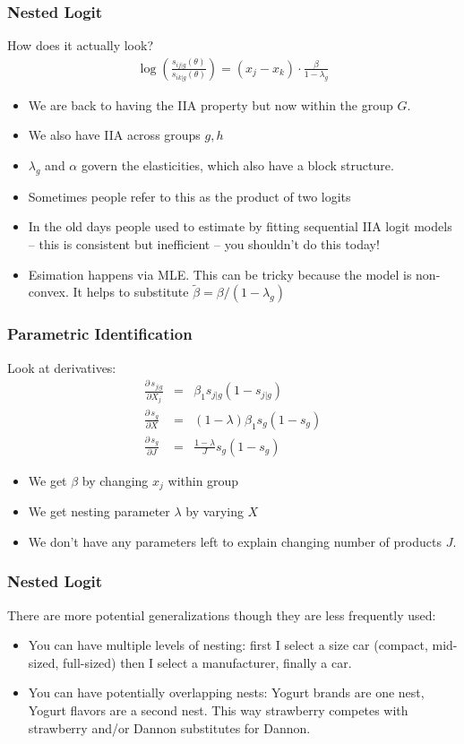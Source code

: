\documentclass[xcolor=pdftex,dvipsnames,table,mathserif]{beamer}
\begin{document}
\begin{frame}
\frametitle{Nested Logit}
How does it actually look?
\begin{eqnarray*}
\log \left(\frac{s_{ij|g}(\theta)}{s_{ik|g}(\theta)} \right) = (x_j -x_k)\cdot \frac{\beta}{1-\lambda_g}
 \end{eqnarray*}
 \begin{itemize}
\item We are back to having the IIA property but now within the group $G$.
\item We also have IIA across groups $g,h$
\item $\lambda_g$ and $\alpha$ govern the elasticities, which also have a block structure. %
\item Sometimes people refer to this as the \alert{product of two logits}
\item In the old days people used to estimate by fitting sequential IIA logit models -- this is consistent but inefficient -- you shouldn't do this today!
\item Esimation happens via MLE. This can be tricky because the model is non-convex. It helps to substitute $\tilde{\beta} = \beta/(1-\lambda_g)$
 \end{itemize}
\end{frame}

\begin{frame}
\frametitle{Parametric Identification}

Look at derivatives:
\begin{eqnarray*}
\frac{\partial\, s_{j|g}}{\partial X_j} &=& \beta_1 s_{j|g}(1-s_{j|g}) \\
 \frac{\partial\, s_{g}}{\partial X} &=& (1-\lambda) \beta_1 s_{g}(1-s_{g}) \\
  \frac{\partial\, s_{g}}{\partial J} &=& \frac{1-\lambda}{J} s_{g}(1-s_{g})
\end{eqnarray*}
\begin{itemize}
\item We get $\beta$ by changing $x_j$ within group
\item We get nesting parameter $\lambda$ by varying $X$
\item We don't have any parameters left to explain changing number of products $J$.
\end{itemize}

\end{frame}



\begin{frame}
\frametitle{Nested Logit}
There are more potential generalizations though they are less frequently used:
 \begin{itemize}
\item You can have multiple levels of nesting: first I select a size car (compact, mid-sized, full-sized) then I select a manufacturer, finally a car.
\item You can have potentially overlapping nests: Yogurt brands are one nest, Yogurt flavors are a second nest. This way strawberry competes with strawberry and/or Dannon substitutes for Dannon.
 \end{itemize}
\end{frame}
\end{document}
